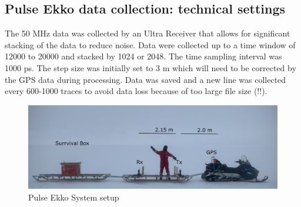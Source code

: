 \documentclass[a4paper,12pt]{article}
\begin{document}
\subsection{Pulse Ekko data collection: technical settings}
The 50 MHz data was collected by an Ultra Receiver that allows for significant stacking of the data to reduce noise. Data were collected up to a time window of 12000 to 20000 and stacked by 1024 or 2048. The time sampling interval was 1000 ps. The step size was initially set to 3 m which will need to be corrected by the GPS data during processing. Data was saved and a new line was collected every 600-1000 traces to avoid data loss because of too large file size (!!). 
\begin{figure}[H]
\includegraphics[width=\textwidth]{Figures/PulseEkko/RadarSetup.png}
\caption{Pulse Ekko System setup}
\label{fig_PE}
\end{figure}
\end{document}
